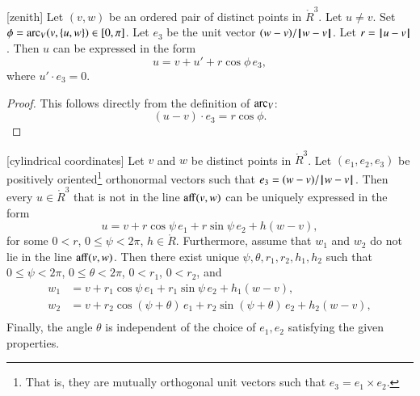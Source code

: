 \begin{lemma}[zenith]
Let $(v,w)$ be an ordered pair of distinct points in $\ring{R}^3$.
Let $u\ne v$.  Set $\phi = \operatorname{arc}_V(v,\{u,w\})\in[0,\pi]$.
Let $e_3$ be the unit vector $(w-v)/{\hskip0.1em|\hskip-0.15em|\hskip0.1em}w - v{\hskip0.1em|\hskip-0.15em|\hskip0.1em}$.  Let $r = {\hskip0.1em|\hskip-0.15em|\hskip0.1em}u - v{\hskip0.1em|\hskip-0.15em|\hskip0.1em}$.
Then $u$
can be expressed in the form
   $$
   u = v + u' +
   r\cos\phi\, e_3,
   $$
where $u'\cdot e_3 = 0$.
\end{lemma}

\begin{proof} This follows directly from the definition of $\operatorname{arc}_V$:
  $$(u-v)\cdot e_3 = r\cos\phi.$$
\end{proof}



\begin{lemma}[cylindrical coordinates]
Let $v$ and $w$ be distinct points in 
$\ring{R}^3$.  Let $(e_1,e_2,e_3)$ be positively oriented\footnote{That is, they are mutually orthogonal unit vectors such that $e_3 = e_1 \times e_2$.} orthonormal
vectors such that $e_3 = (w-v)/{\hskip0.1em|\hskip-0.15em|\hskip0.1em}w - v{\hskip0.1em|\hskip-0.15em|\hskip0.1em}$.
Then every
$u\in\ring{R}^3$ that is not in the line ${\operatorname{aff}}(v,w)$
can be uniquely expressed in the form
   $$
   u = v + r\cos\psi\, e_1 + r\sin\psi\, e_2 + h (w-v),
   $$
for some $0< r$, $0\le \psi < 2\pi$, $h\in\ring{R}$.
Furthermore,
assume that $w_1$ and $w_2$ do
not lie in the line ${\operatorname{aff}}(v,w)$.
Then there exist unique $\psi,\theta,r_1,r_2,h_1,h_2$
 such
that $0\le\psi<2\pi$, $0\le\theta < 2\pi$, $0 < r_1$, $0 < r_2$, and
  $$
  \begin{array}{lll}
    w_1 &= v + r_1\cos\psi\, e_1 + r_1\sin\psi\, e_2 + h_1(w-v),\\
    w_2 &= v + r_2\cos(\psi+\theta)\, e_1 + r_2\sin(\psi+\theta)\, e_2 
     + h_2(w-v),\\
\end{array}
  $$
Finally, the angle $\theta$ is independent of the choice of $e_1,e_2$
satisfying the given properties.
\end{lemma}

